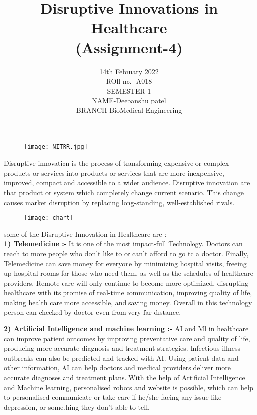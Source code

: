 \documentclass[12pt]{article}
\title{\textbf{ Disruptive Innovations in Healthcare }\\(Assignment-4)}
\date{14th February 2022\\ROll no.- A018\\SEMESTER-1\\NAME-Deepanshu patel\\BRANCH-BioMedical Engineering}
\begin{document}
\begin{figure}[h]
\centering
\texttt{[image: NITRR.jpg]}

\maketitle
\end{figure}




\clearpage

Disruptive innovation is the process of transforming expensive or complex products or services into products or services that are more inexpensive, improved, compact and accessible to a wider audience. Disruptive innovation are that product or system which completely change current scenario.  This change causes market disruption by replacing long-standing, well-established rivals.\\
\begin{figure}[h]
\centering
\texttt{[image: chart]}
\end{figure}

some of the Disruptive Innovation in Healthcare are :-\\

\textbf{1) Telemedicine :-} It is one of the most impact-full Technology. Doctors can reach to more people who don’t like to or can’t afford to go to a doctor. Finally, Telemedicine can save money for everyone by minimizing hospital visits, freeing up hospital rooms for those who need them, as well as the schedules of healthcare providers. Remote care will only continue to become more optimized, disrupting healthcare with its promise of real-time communication, improving quality of life, making health care more accessible, and saving money. Overall in this technology person can checked by doctor even from very far distance. 

\clearpage

\textbf{2) Artificial Intelligence and machine learning :-} AI and Ml in healthcare can improve patient outcomes by improving preventative care and quality of life, producing more accurate diagnosis and treatment strategies. Infectious illness outbreaks can also be predicted and tracked with AI. Using patient data and other information, AI can help doctors and medical providers deliver more accurate diagnoses and treatment plans. With the help of Artificial Intelligence and Machine learning, personalised robots and website is possible, which can help to personalised communicate or take-care if he/she facing any issue like depression, or something they don't able to tell.  \\
\end{document}
